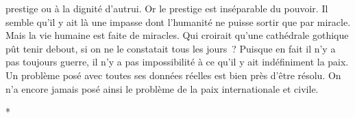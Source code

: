 \documentclass[french,twoside]{book} %
\begin{document}
prestige ou à la dignité d'autrui. Or le prestige est inséparable du pouvoir. Il semble qu'il y ait là une impasse dont l'humanité ne puisse sortir que par miracle. Mais la vie humaine est faite de miracles. Qui croirait qu'une cathédrale gothique pût tenir debout, si on ne le constatait tous les jours ? Puisque en fait il n'y a pas toujours guerre, il n'y a pas impossibilité à ce qu'il y ait indéfiniment la paix. Un problème posé avec toutes ses données réelles est bien près d'être résolu. On n'a encore jamais posé ainsi le problème de la paix internationale et civile.\par

\begin{center}
\noindent \centerline{*}\par
\end{center}
\end{document}
